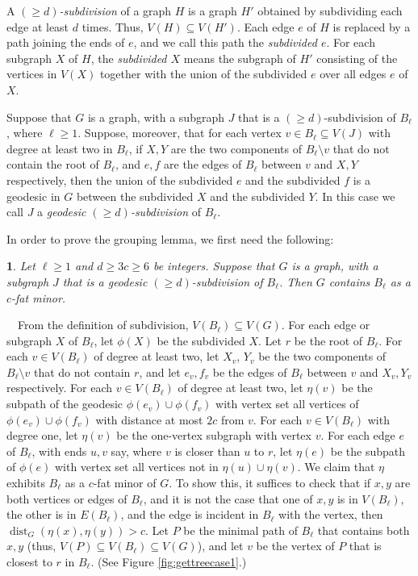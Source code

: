 \documentclass[titlepage,11pt]{article}
\newcommand{\dist}{\operatorname{dist}}
\newtheorem{thm}{}[section]
\newcommand{\Proof}{\noindent{\bf Proof.}\ \ }
\begin{document}
	A {\em $(\ge d)$-subdivision} of a graph $H$ is a graph $H'$ obtained by subdividing each edge at least $d$ times. Thus,
	$V(H)\subseteq V(H')$.
	Each edge $e$ of $H$ is replaced by a path joining the ends of $e$, and we call this path the {\em subdivided $e$}. For each subgraph $X$ of $H$, the {\em subdivided $X$} means the subgraph of $H'$ consisting of the vertices in $V(X)$ together with the union of the subdivided $e$ over all edges $e$ of $X$.
	
	Suppose that $G$ is a graph, with a subgraph $J$ that is a $(\ge d)$-subdivision
	of $B_{\ell}$, where $\ell\ge 1$. Suppose, moreover, that for each vertex $v\in B_\ell\subseteq V(J)$ with degree at least two in $B_\ell$, if $X, Y$
	are the two components of $B_\ell\setminus v$ that
	do not contain the root of $B_\ell$, and $e,f$ are the edges of $B_\ell$ between $v$ and $X,Y$ respectively, then the union
	of the subdivided $e$ and the subdivided $f$ is a geodesic in $G$ between the subdivided $X$ and the subdivided $Y$. In this case we
	call $J$ a {\em geodesic $(\ge d)$-subdivision} of $B_\ell$.
	
	In order to prove the grouping lemma, we first need the following:
	\begin{thm}\label{gettree}
		Let $\ell\ge 1$ and $d\ge 3c\ge 6$ be integers. Suppose that $G$ is a graph, with a subgraph $J$ that is a geodesic $(\ge d)$-subdivision
		of $B_{\ell}$.
		Then $G$ contains $B_\ell$ as a $c$-fat minor.
	\end{thm}
	\Proof From the definition of subdivision, $V(B_\ell)\subseteq V(G)$. For each edge or subgraph $X$ of $B_\ell$, let $\phi(X)$ be the subdivided $X$.
	Let $r$ be the root of $B_\ell$. For each $v\in V(B_\ell)$ of degree at least two, let $X_v$, $Y_v$ be the two components of
	$B_\ell \setminus v$ that do not contain $r$, and let $e_v, f_v$ be the edges of $B_\ell$ between $v$ and $X_v, Y_v$ respectively.
	For each $v\in V(B_\ell)$ of degree at least two, let $\eta(v)$ be the subpath of the geodesic $\phi(e_v)\cup \phi(f_v)$
	with vertex set all vertices of $\phi(e_v)\cup \phi(f_v)$ with distance at most $2c$ from $v$. For each $v\in V(B_\ell)$ with
	degree one, let $\eta(v)$ be the one-vertex subgraph with vertex $v$. For each edge $e$ of $B_\ell$, with ends $u,v$ say,
	where $v$ is closer than $u$ to $r$, let $\eta(e)$ be the subpath of $\phi(e)$ with vertex set all vertices not in
	$\eta(u)\cup \eta(v)$.
	We claim that $\eta$ exhibits $B_\ell$ as a $c$-fat minor of $G$. To show this, it
	suffices to check that if $x,y$ are both vertices or edges of $B_\ell$, and it is not the case that
	one of
	$x,y$ is in $V(B_\ell)$, the other is
	in $E(B_\ell)$,
	and the edge is incident in $B_\ell$ with the vertex, then $\dist_G(\eta(x),\eta(y))>c$. Let $P$ be the minimal path of $B_\ell$
	that contains both $x,y$ (thus, $V(P)\subseteq V(B_\ell)\subseteq V(G)$), and let $v$ be the vertex of $P$ that is closest to $r$ in $B_\ell$. (See Figure \ref{fig:gettreecase1}.)
	
\end{document}
